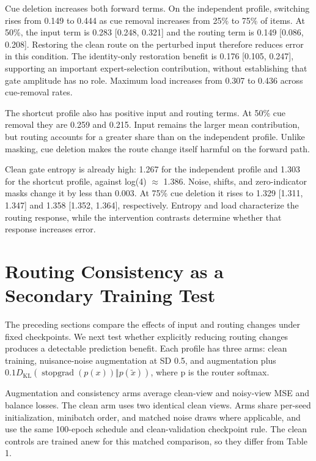 \documentclass[10pt,letterpaper]{article}
\begin{document}
Cue deletion increases both forward terms. On the independent profile, switching rises from 0.149 to 0.444 as cue removal increases from 25\% to 75\% of items. At 50\%, the input term is 0.283 [0.248, 0.321] and the routing term is 0.149 [0.086, 0.208]. Restoring the clean route on the perturbed input therefore reduces error in this condition. The identity-only restoration benefit is 0.176 [0.105, 0.247], supporting an important expert-selection contribution, without establishing that gate amplitude has no role. Maximum load increases from 0.307 to 0.436 across cue-removal rates.


The shortcut profile also has positive input and routing terms. At 50\% cue removal they are 0.259 and 0.215. Input remains the larger mean contribution, but routing accounts for a greater share than on the independent profile. Unlike masking, cue deletion makes the route change itself harmful on the forward path.


Clean gate entropy is already high: 1.267 for the independent profile and 1.303 for the shortcut profile, against log(4) \ensuremath{\approx} 1.386. Noise, shifts, and zero-indicator masks change it by less than 0.003. At 75\% cue deletion it rises to 1.329 [1.311, 1.347] and 1.358 [1.352, 1.364], respectively. Entropy and load characterize the routing response, while the intervention contrasts determine whether that response increases error.


\FloatBarrier

\section{Routing Consistency as a Secondary Training Test}

The preceding sections compare the effects of input and routing changes under fixed checkpoints. We next test whether explicitly reducing routing changes produces a detectable prediction benefit. Each profile has three arms: clean training, nuisance-noise augmentation at SD 0.5, and augmentation plus $0.1D_{\mathrm{KL}}(\operatorname{stopgrad}(p(x))\Vert p(\tilde x))$, where p is the router softmax.


Augmentation and consistency arms average clean-view and noisy-view MSE and balance losses. The clean arm uses two identical clean views. Arms share per-seed initialization, minibatch order, and matched noise draws where applicable, and use the same 100-epoch schedule and clean-validation checkpoint rule. The clean controls are trained anew for this matched comparison, so they differ from Table 1.
\end{document}
